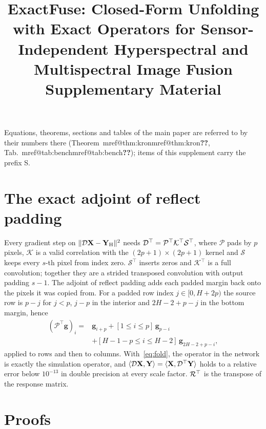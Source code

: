 \documentclass[10pt,twocolumn,letterpaper]{article}
\title{ExactFuse: Closed-Form Unfolding with Exact Operators for Sensor-Independent Hyperspectral and Multispectral Image Fusion\\[2pt]
\large Supplementary Material}
\author{\cvprauthors}   %
\makeatletter
\newcommand{\mref}[1]{\ifcsname mref@#1\endcsname\csname mref@#1\endcsname\else\textbf{??}\fi}
\makeatother
\begin{document}
\maketitle

\noindent Equations, theorems, sections and tables of the main paper are referred to by their numbers there (\eg Theorem~\mref{thm:kron}, Tab.~\mref{tab:bench}); items of this supplement carry the prefix S.

\section{The exact adjoint of reflect padding}
\label{sec:adjoint}
Every gradient step on $\|\mathcal{D}\mathbf{X}-\mathbf{Y}_{\mathrm{H}}\|^2$ needs $\mathcal{D}^{\top}=\mathcal{P}^{\top}\mathcal{K}^{\top}\mathcal{S}^{\top}$, where $\mathcal{P}$ pads by $p$ pixels, $\mathcal{K}$ is a valid correlation with the $(2p+1)\times(2p+1)$ kernel and $\mathcal{S}$ keeps every $s$-th pixel from index zero. $\mathcal{S}^{\top}$ inserts zeros and $\mathcal{K}^{\top}$ is a full convolution; together they are a strided transposed convolution with output padding $s-1$. The adjoint of reflect padding adds each padded margin back onto the pixels it was copied from. For a padded row index $j\in[0,H+2p)$ the source row is $p-j$ for $j<p$, $j-p$ in the interior and $2H-2+p-j$ in the bottom margin, hence
\begin{equation}
\begin{split}
(\mathcal{P}^{\top}\mathbf{g})_i={}&\mathbf{g}_{i+p}+[1\le i\le p]\,\mathbf{g}_{p-i}\\
&+[H-1-p\le i\le H-2]\,\mathbf{g}_{2H-2+p-i},
\end{split}
\label{eq:fold}
\end{equation}
applied to rows and then to columns. With~\eqref{eq:fold}, the operator in the network is exactly the simulation operator, and $\langle\mathcal{D}\mathbf{X},\mathbf{Y}\rangle=\langle\mathbf{X},\mathcal{D}^{\top}\mathbf{Y}\rangle$ holds to a relative error below $10^{-13}$ in double precision at every scale factor. $\mathcal{R}^{\top}$ is the transpose of the response matrix.

\section{Proofs}
\label{sec:proofs}
\end{document}
